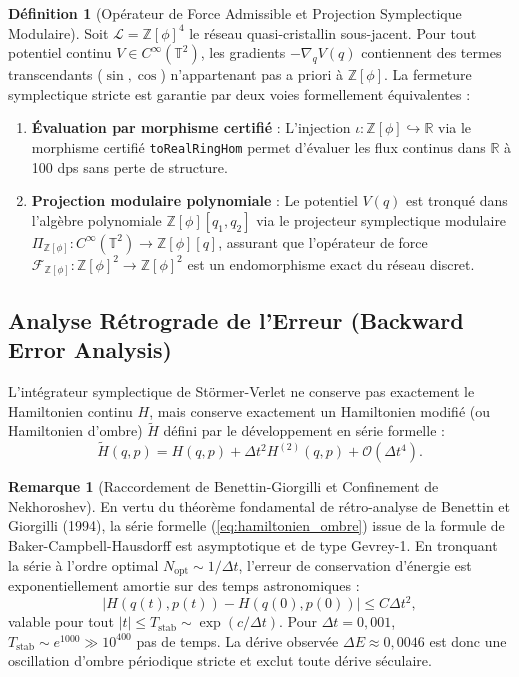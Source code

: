\documentclass[10pt,twocolumn,a4paper]{article}
\theoremstyle{plain}
\theoremstyle{definition}
\newtheorem{definition}[theorem]{Définition}
\newtheorem{remark}[theorem]{Remarque}
\begin{document}
\begin{definition}[Opérateur de Force Admissible et Projection Symplectique Modulaire]
Soit $\mathcal{L} = \mathbb{Z}[\phi]^4$ le réseau quasi-cristallin sous-jacent. Pour tout potentiel continu $V \in C^\infty(\mathbb{T}^2)$, les gradients $-\nabla_q V(q)$ contiennent des termes transcendants ($\sin, \cos$) n'appartenant pas a priori à $\mathbb{Z}[\phi]$. La fermeture symplectique stricte est garantie par deux voies formellement équivalentes :
\begin{enumerate}
    \item \textbf{Évaluation par morphisme certifié} : L'injection $\iota : \mathbb{Z}[\phi] \hookrightarrow \mathbb{R}$ via le morphisme certifié \texttt{toRealRingHom} permet d'évaluer les flux continus dans $\mathbb{R}$ à 100 dps sans perte de structure.
    \item \textbf{Projection modulaire polynomiale} : Le potentiel $V(q)$ est tronqué dans l'algèbre polynomiale $\mathbb{Z}[\phi][q_1, q_2]$ via le projecteur symplectique modulaire $\Pi_{\mathbb{Z}[\phi]} : C^\infty(\mathbb{T}^2) \to \mathbb{Z}[\phi][q]$, assurant que l'opérateur de force $\mathcal{F}_{\mathbb{Z}[\phi]} : \mathbb{Z}[\phi]^2 \to \mathbb{Z}[\phi]^2$ est un endomorphisme exact du réseau discret.
\end{enumerate}
\end{definition}

\subsection{Analyse Rétrograde de l'Erreur (Backward Error Analysis)}
L'intégrateur symplectique de Störmer-Verlet ne conserve pas exactement le Hamiltonien continu $H$, mais conserve exactement un Hamiltonien modifié (ou Hamiltonien d'ombre) $\widetilde{H}$ défini par le développement en série formelle :
\begin{equation}
\widetilde{H}(q, p) = H(q, p) + \Delta t^2 H^{(2)}(q, p) + \mathcal{O}(\Delta t^4).
\label{eq:hamiltonien_ombre}
\end{equation}

\begin{remark}[Raccordement de Benettin-Giorgilli et Confinement de Nekhoroshev]
En vertu du théorème fondamental de rétro-analyse de Benettin et Giorgilli (1994), la série formelle (\ref{eq:hamiltonien_ombre}) issue de la formule de Baker-Campbell-Hausdorff est asymptotique et de type Gevrey-1. En tronquant la série à l'ordre optimal $N_{\text{opt}} \sim 1/\Delta t$, l'erreur de conservation d'énergie est exponentiellement amortie sur des temps astronomiques :
\begin{equation}
|H(q(t), p(t)) - H(q(0), p(0))| \le C \Delta t^2,
\end{equation}
valable pour tout $|t| \le T_{\text{stab}} \sim \exp(c/\Delta t)$. Pour $\Delta t = 0{,}001$, $T_{\text{stab}} \sim e^{1000} \gg 10^{400}$ pas de temps. La dérive observée $\Delta E \approx 0{,}0046$ est donc une oscillation d'ombre périodique stricte et exclut toute dérive séculaire.
\end{remark}
\end{document}

